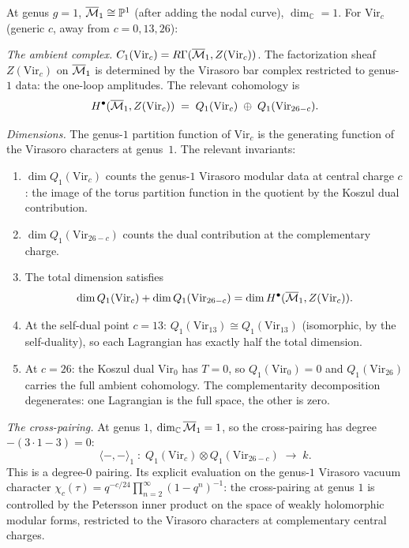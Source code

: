 \begin{computation}
At genus $g = 1$, $\overline{\mathcal{M}}_1 \cong \mathbb{P}^1$
(after adding the nodal curve), $\dim_\mathbb{C} = 1$.
For $\mathrm{Vir}_c$ (generic $c$, away from $c = 0, 13, 26$):

\emph{The ambient complex.}
$C_1(\mathrm{Vir}_c) = R\Gamma(\overline{\mathcal{M}}_1, Z(\mathrm{Vir}_c))$.
The factorization sheaf $Z(\mathrm{Vir}_c)$ on $\overline{\mathcal{M}}_1$
is determined by the Virasoro bar complex restricted to
genus-$1$ data: the one-loop amplitudes.
The relevant cohomology is
\[
H^\bullet(\overline{\mathcal{M}}_1, Z(\mathrm{Vir}_c))
\;=\;
Q_1(\mathrm{Vir}_c) \;\oplus\; Q_1(\mathrm{Vir}_{26-c}).
\]

\emph{Dimensions.}
The genus-$1$ partition function of $\mathrm{Vir}_c$ is the
generating function of the Virasoro characters at genus~$1$.
The relevant invariants:
\begin{enumerate}[label=\textup{(\roman*)}]
\item $\dim Q_1(\mathrm{Vir}_c)$ counts the genus-$1$
 Virasoro modular data at central charge $c$:
 the image of the torus partition function in the
 quotient by the Koszul dual contribution.
\item $\dim Q_1(\mathrm{Vir}_{26-c})$ counts the dual
 contribution at the complementary charge.
\item The total dimension satisfies
 \[
 \dim Q_1(\mathrm{Vir}_c) + \dim Q_1(\mathrm{Vir}_{26-c})
 = \dim H^\bullet(\overline{\mathcal{M}}_1, Z(\mathrm{Vir}_c)).
 \]
\item At the self-dual point $c = 13$:
 $Q_1(\mathrm{Vir}_{13}) \cong Q_1(\mathrm{Vir}_{13})$
 (isomorphic, by the self-duality),
 so each Lagrangian has exactly half the total dimension.
\item At $c = 26$: the Koszul dual $\mathrm{Vir}_0$ has
 $T = 0$, so $Q_1(\mathrm{Vir}_0) = 0$ and
 $Q_1(\mathrm{Vir}_{26})$ carries the full ambient cohomology.
 The complementarity decomposition degenerates: one Lagrangian
 is the full space, the other is zero.
\end{enumerate}

\emph{The cross-pairing.}
At genus $1$, $\dim_\mathbb{C}\overline{\mathcal{M}}_1 = 1$, so the
cross-pairing has degree $-(3 \cdot 1 - 3) = 0$:
\[
\langle -, - \rangle_1
\;:\;
Q_1(\mathrm{Vir}_c) \otimes Q_1(\mathrm{Vir}_{26-c})
\;\longrightarrow\; k.
\]
This is a degree-$0$ pairing.
Its explicit evaluation on the genus-$1$ Virasoro vacuum character
$\chi_c(\tau) = q^{-c/24}\prod_{n=2}^\infty(1-q^n)^{-1}$:
the cross-pairing at genus $1$ is controlled by the
Petersson inner product on the space of weakly holomorphic
modular forms, restricted to the Virasoro characters
at complementary central charges.
\end{computation}

